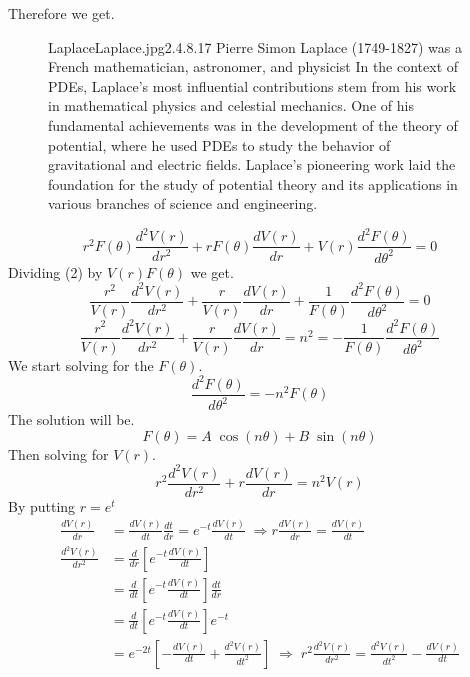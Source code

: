 \documentclass[]{article}
\begin{document}
Therefore we get.
\begin{figure}[b]
    \begin{enrichment}{Laplace}{Laplace.jpg}{2.4}{.8}{.17}
        Pierre Simon Laplace (1749-1827) was a French mathematician, astronomer, and physicist 
        In the context of PDEs, Laplace's most influential contributions stem from his work in mathematical physics and celestial mechanics. One of his fundamental achievements was in the development of the theory of potential, where he used PDEs to study the behavior of gravitational and electric fields. Laplace's pioneering work laid the foundation for the study of potential theory and its applications in various branches of science and engineering.
    \end{enrichment}    
\end{figure}
\begin{equation}
r^2F(\theta)\frac{d^2 V(r)}{dr^2} +rF(\theta)\frac{d V(r)}{dr} + V(r)\frac{d^2 F(\theta)}{d\theta^2} = 0
\end{equation}
Dividing (2) by $V(r)F(\theta)$ we get.
\begin{equation}
\frac{r^2}{V(r)}\frac{d^2 V(r)}{dr^2} +\frac{r}{V(r)}\frac{d V(r)}{dr} + \frac{1}{F(\theta)}\frac{d^2 F(\theta)}{d\theta^2} = 0
\end{equation}
\[
    \frac{r^2}{V(r)}\frac{d^2 V(r)}{dr^2} +\frac{r}{V(r)}\frac{d V(r)}{dr} = n^2 = -\frac{1}{F(\theta)}\frac{d^2 F(\theta)}{d\theta^2}    
\]
We start solving for the $F(\theta)$. 
\[
    \frac{d^2 F(\theta)}{d\theta^2} = -n^2F(\theta)    
\]
The solution will be. 
\begin{equation}
F(\theta) = A\;\cos(n\theta)+B\;\sin(n\theta)
\end{equation}
Then solving for $V(r)$.
\[
r^2\frac{d^2 V(r)}{dr^2} +r\frac{d V(r)}{dr} = n^2V(r)    
\]
By putting $r = e^t$
\begin{align*}
\frac{dV(r)}{dr} &= \frac{dV(r)}{dt}\frac{dt}{dr} = e^{-t} \frac{dV(r)}{dt}\;\Rightarrow  r \frac{dV(r)}{dr}=\frac{dV(r)}{dt}
\\
\frac{d^2V(r)}{dr^2} &= \frac{d}{dr}\left[e^{-t} \frac{dV(r)}{dt}\right]
\\
&=  \frac{d}{dt}\left[e^{-t} \frac{dV(r)}{dt}\right] \frac{dt}{dr} 
\\
&= \frac{d}{dt}\left[e^{-t} \frac{dV(r)}{dt}\right] e^{-t}
\\
&= e^{-2t}\left[-\frac{dV(r)}{dt}+\frac{d^2V(r)}{dt^2}\right] \;\Rightarrow\; r^2\frac{d^2V(r)}{dr^2} = \frac{d^2V(r)}{dt^2}-\frac{dV(r)}{dt}
\end{align*}
\end{document}
